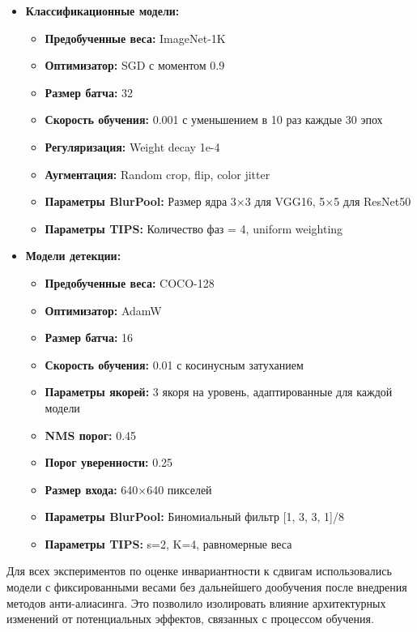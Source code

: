 \begin{itemize}
    \item \textbf{Классификационные модели:}
    \begin{itemize}
        \item \textbf{Предобученные веса:} ImageNet-1K
        \item \textbf{Оптимизатор:} SGD с моментом 0.9
        \item \textbf{Размер батча:} 32
        \item \textbf{Скорость обучения:} 0.001 с уменьшением в 10 раз каждые 30 эпох
        \item \textbf{Регуляризация:} Weight decay 1e-4
        \item \textbf{Аугментация:} Random crop, flip, color jitter
        \item \textbf{Параметры BlurPool:} Размер ядра 3×3 для VGG16, 5×5 для ResNet50
        \item \textbf{Параметры TIPS:} Количество фаз = 4, uniform weighting
    \end{itemize}
    
    \item \textbf{Модели детекции:}
    \begin{itemize}
        \item \textbf{Предобученные веса:} COCO-128
        \item \textbf{Оптимизатор:} AdamW
        \item \textbf{Размер батча:} 16
        \item \textbf{Скорость обучения:} 0.01 с косинусным затуханием
        \item \textbf{Параметры якорей:} 3 якоря на уровень, адаптированные для каждой модели
        \item \textbf{NMS порог:} 0.45
        \item \textbf{Порог уверенности:} 0.25
        \item \textbf{Размер входа:} 640×640 пикселей
        \item \textbf{Параметры BlurPool:} Биномиальный фильтр [1, 3, 3, 1]/8
        \item \textbf{Параметры TIPS:} s=2, K=4, равномерные веса
    \end{itemize}
\end{itemize}

Для всех экспериментов по оценке инвариантности к сдвигам использовались модели с фиксированными весами без дальнейшего дообучения после внедрения методов анти-алиасинга. Это позволило изолировать влияние архитектурных изменений от потенциальных эффектов, связанных с процессом обучения.

